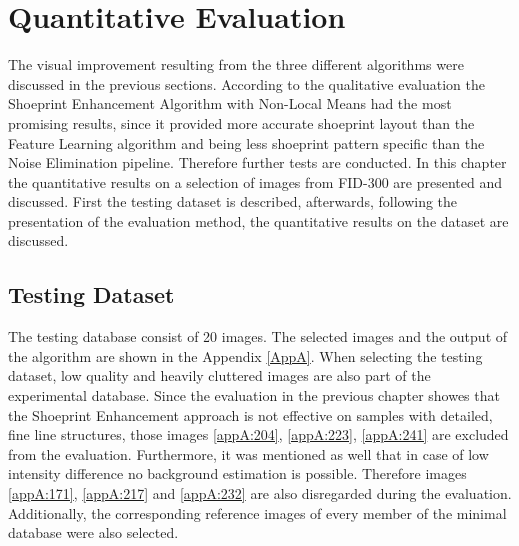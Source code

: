 \documentclass[draft,final]{vutinfth} %
\begin{document}
\section{Quantitative Evaluation}
\par
The visual improvement resulting from the three different algorithms were discussed in the previous sections.
According to the qualitative evaluation the Shoeprint Enhancement Algorithm with Non-Local Means had the most promising results, since it provided more accurate shoeprint layout than the Feature Learning algorithm and being less shoeprint pattern specific than the Noise Elimination pipeline.
Therefore further tests are conducted.
In this chapter the quantitative results on a selection of images from FID-300 are presented and discussed.
First the testing dataset is described, afterwards, following the presentation of the evaluation method, the quantitative results on the dataset are discussed.

\subsection{Testing Dataset}

The testing database consist of 20 images.
The selected images and the output of the algorithm are shown in the Appendix \ref{AppA}.
When selecting the testing dataset, low quality and heavily cluttered images are also part of the experimental database.
Since the evaluation in the previous chapter showes that the Shoeprint Enhancement approach is not effective on samples with detailed, fine line structures, those images \ref{appA:204}, \ref{appA:223}, \ref{appA:241} are excluded from the evaluation.
Furthermore, it was mentioned as well that in case of low intensity difference no background estimation is possible. 
Therefore images \ref{appA:171}, \ref{appA:217} and \ref{appA:232} are also disregarded during the evaluation.
Additionally, the corresponding reference images of every member of the minimal database were also selected.
\end{document}
